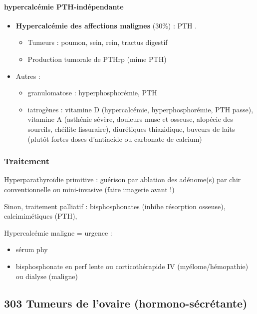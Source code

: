 \documentclass[11pt]{article}
\begin{document}
\paragraph{hypercalcémie PTH-indépendante}
\label{sec:orgb369b9b}
\begin{itemize}
\item \textbf{Hypercalcémie des affections malignes} (30\%) : PTH \dec\dec{}. 
\begin{itemize}
\item Tumeurs : poumon, sein, rein, tractus digestif
\item Production tumorale de PTHrp (mime PTH)
\end{itemize}
\item Autres : 
\begin{itemize}
\item granulomatose : hyperphosphorémie, PTH \dec
\item iatrogènes : vitamine D (hypercalcémie, hyperphosphorémie, PTH passe),
vitamine A (asthénie sévère, douleurs musc et osseuse, alopécie des
sourcils, chéilite fissuraire), diurétiques thiazidique, buveurs de laits
(plutôt fortes doses d'antiacide ou carbonate de calcium)
\end{itemize}
\end{itemize}

\subsubsection{Traitement}
\label{sec:orgeab131c}
Hyperparathyroïdie primitive : guérison par ablation des adénome(s) par chir
conventionnelle ou mini-invasive (faire imagerie avant !)

Sinon, traitement palliatif : bisphosphonates (inhibe résorption osseuse),
calcimimétiques (\dec PTH), 

\danger Hypercalcémie maligne = urgence \faBomb{} : 
\begin{itemize}
\item sérum phy
\item bisphosphonate en perf lente ou corticothérapide IV (myélome/hémopathie) ou dialyse (maligne)
\end{itemize}
\subsection{303 \textdagger{} Tumeurs de l'ovaire (hormono-sécrétante)}
\label{sec:org83bba0a}
\end{document}
